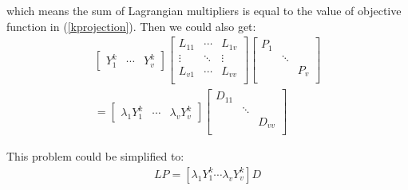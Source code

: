 \documentclass[journal]{IEEEtran}
\begin{document}
which means the sum of Lagrangian multipliers is equal to the value of objective function in (\ref{kprojection}). 
Then we could also get:
\begin{gather}
\left[
\begin{array}{ccc}
Y_1^{k}  &\cdots &Y_v^{k}
\end{array}
\right]
\left[
\begin{array}{ccc}
L_{11}  &\cdots & L_{1v} \\
\vdots & \ddots & \vdots  \\
L_{v1} & \cdots & L_{vv} \\
\end{array}
\right]
\left[
\begin{array}{ccc}
P_1  &  &  \\
 & \ddots &  \\
 &  & P_v \\
\end{array}
\right] \\
=\left[
\begin{array}{ccc}
\lambda_1 Y_1^{k}  &\cdots & \lambda_v Y_v^{k}
\end{array}
\right]
\left[
\begin{array}{ccc} 
D_{11}  &  & \\
 & \ddots &  \\
 &  &  D_{vv} \\
\end{array}
\right] \nonumber
\end{gather}

This problem could be simplified to: 
\begin{gather}
[Y_1^k \cdots Y_v^k] L P = [\lambda_1Y_1^k \cdots \lambda_vY_v^k] D
\end{gather}
\end{document}
